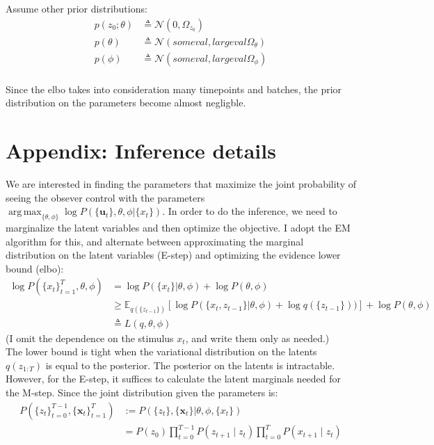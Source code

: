 \documentclass[11pt, reqno]{article}
\DeclareMathOperator*{\argmax}{arg\,max}
\numberwithin{equation}{section}
\begin{document}
Assume other prior distributions:
\begin{align*}
p(z_0; \theta) &\triangleq \mathcal{N}(0, \Omega_{z_0})\\
p(\theta) &\triangleq \mathcal{N}( someval, largeval \Omega_\theta)\\
p(\phi) &\triangleq \mathcal{N}( someval, largeval \Omega_\phi)\\
\end{align*}

Since the elbo takes into consideration many timepoints and batches, the prior distribution on the parameters become almost negligble.  

\section{Appendix: Inference details}
\noindent We are interested in finding the parameters that maximize the joint probability of seeing the obsever control with the parameters $ \argmax_{\{\theta, \phi\}} \log P(\{\bm{u}_t\}, \theta, \phi | \{x_t\})$. In order to do the inference, we need to marginalize the latent variables and then optimize the objective. I adopt the EM algorithm for this, and alternate between approximating the marginal distribution on the latent variables (E-step) and optimizing the evidence lower bound (elbo): 
\begin{align*}
\log P(\{x_t\}_{t=1}^T, \theta, \phi) &= \log P(\{x_t\} | \theta, \phi) + \log P(\theta, \phi)   \\
&\geq \mathbb{E}_{q(\{z_{t-1}\})} \left[ \log P(\{x_{t}, z_{t-1}\}|\theta, \phi)  + \log q(\{z_{t-1}\})) \right]+ \log P(\theta, \phi) \\
& \triangleq L(q,\theta,\phi)
\end{align*}
(I omit the dependence on the stimulus $x_t$, and write them only as needed.) \\

The lower bound is tight when the variational distribution on the latents $q(z_{1:T})$ is equal to the posterior. The posterior on the latents is intractable. However, for the E-step, it suffices to calculate the latent marginals needed for the M-step. Since the joint distribution given the parameters is:
\begin{align*}
P(\{z_t\}_{t=0}^{T-1}, \{\bm{x}_t\}_{t=1}^T) & := P(\{z_t\}, \{\bm{x}_t\}|\theta, \phi, \{x_t\}) \\
&= P(z_0) \prod_{t=0}^{T-1} P(z_{t+1} \mid z_t) \prod_{t=0}^T P(x_{t+1} \mid z_t)
\end{align*}
\end{document}
